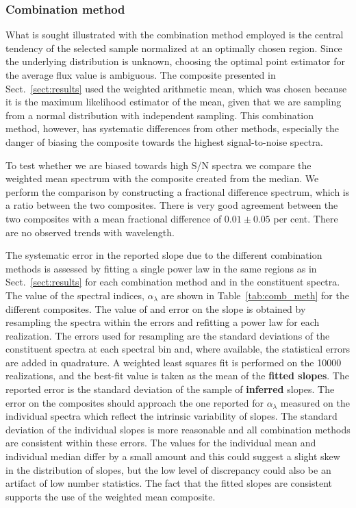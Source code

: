 \documentclass{aa}    %
\newcommand{\Tab}[1]{Table~\ref{tab:#1}}
\newcommand{\tab}[1]{\Tab{#1}}
\newcommand{\sectionname}{Sect.}
\newcommand{\Sect}[1]{\sectionname~\ref{sect:#1}}
\newcommand{\sect}[1]{\Sect{#1}}
\newcommand{\sectlabel}[1]{\label{sect:#1}}
\begin{document}
\subsubsection{Combination method}  \sectlabel{Combination method}
What is sought illustrated with the combination method employed is the central
tendency of the selected sample normalized at an optimally chosen region. Since
the underlying distribution is unknown, choosing the optimal point estimator for
the average flux value is ambiguous. The composite presented in \sect{results}
used the weighted arithmetic mean, which was chosen because it is the maximum
likelihood estimator of the mean, given that we are sampling from a normal
distribution with independent sampling. This combination method, however, has
systematic differences from other methods, especially the danger of biasing the
composite towards the highest signal-to-noise spectra. 

To test whether we are biased towards high S/N spectra we compare the
weighted mean spectrum with the composite created from the median. We
perform the comparison by constructing a fractional difference
spectrum, which is a ratio between the two composites. There is very
good agreement between the two composites with a mean fractional
difference of $0.01 \pm 0.05$ per cent. There are no observed trends with wavelength.

 The systematic error in the reported
slope due to the different combination methods is assessed by fitting
a single power law in the same regions as in \sect{results} for each
combination method and in the constituent spectra. The value of the
spectral indices, $\alpha_\lambda$ are shown in \tab{comb_meth} for the
different composites. The value of and error on the slope is obtained
by resampling the spectra within the errors and refitting a power law for
each realization. The errors used for resampling are the standard
deviations of the constituent spectra at each spectral bin and, where
available, the statistical errors are added in quadrature.
 A weighted least squares fit is performed on the 10000 realizations,
 and the best-fit value is taken as the mean of the \textbf{fitted slopes}. The
 reported error is the standard deviation of the sample of \textbf{inferred} slopes.
 The error on the composites should approach the one reported for
 $\alpha_\lambda$ measured on the individual spectra which reflect the
 intrinsic variability of slopes. The standard deviation of the
 individual slopes is more reasonable and all combination methods are
 consistent within these errors. The values for the individual mean
 and individual median differ by a small amount and this could suggest
 a slight skew in the distribution of slopes, but the low level of
 discrepancy could also be an artifact of low number statistics. The
 fact that the fitted slopes are consistent supports the use of the
 weighted mean composite.
\end{document}
